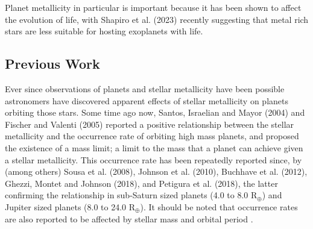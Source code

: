 \documentclass[a4paper,twocolumn,12pt]{article}
\begin{document}
Planet metallicity in particular is important because it has been shown to affect the evolution of life, with Shapiro et al. (2023) \cite{Shapiro} recently suggesting that metal rich stars are less suitable for hosting exoplanets with life.


\subsection{Previous Work}
\label{subsection: Previous Work}
Ever since observations of planets and stellar metallicity have been possible astronomers have discovered apparent effects of stellar metallicity on planets orbiting those stars. Some time ago now, Santos, Israelian and Mayor (2004)\cite{Israelian&Mayor} and Fischer and Valenti (2005)\cite{Fischer&Valenti} reported a positive relationship between the stellar metallicity and the occurrence rate of orbiting high mass planets, and proposed the existence of a mass limit; a limit to the mass that a planet can achieve given a stellar metallicity. This occurrence rate has been repeatedly reported since, by (among others) Sousa et al. (2008)\cite{Sousa.et.al.2008}, Johnson et al. (2010)\cite{Johnson.et.al}, Buchhave et al. (2012)\cite{Buchhave.et.al.2012}, Ghezzi, Montet and Johnson (2018)\cite{Ghezzi.et.al.}, and Petigura et al. (2018)\cite{Petigura.et.al.}, the latter confirming the relationship in sub-Saturn sized planets (4.0 to 8.0 R$_\oplus$) and Jupiter sized planets (8.0 to 24.0 R$_\oplus$). It should be noted that occurrence rates are also reported to be affected by stellar mass and orbital period \cite{Petigura.et.al.}.
\end{document}
